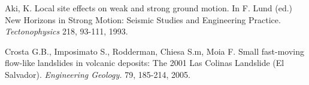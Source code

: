 \documentclass[11pt,twoside]{rmta2010esp}%
\begin{document}
\begin{thebibliography}{99}
Aki, K. 
\newblock Local site effects on weak and strong ground motion. In F. Lund (ed.) New Horizons in Strong Motion: Seismic Studies and Engineering Practice.
\newblock \emph{Tectonophysics}
 218, 93-111, 1993.   


Crosta G.B., Imposimato S., Rodderman, Chiesa S.m, Moia F. 
\newblock Small fast-moving flow-like landslides in volcanic deposits: The 2001 Las Colinas Landslide (El Salvador). 
\newblock \emph{Engineering Geology.}
 79, 185-214, 2005.














\end{thebibliography}
\end{document}
